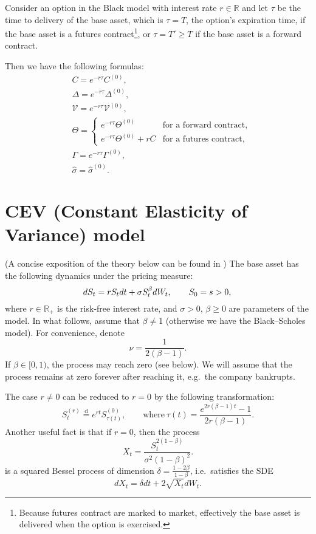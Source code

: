 \documentclass[a4paper,11pt,titlepage]{article}
\newcommand{\R}{\mathbb{R}}
\newcommand{\Vega}{\mathcal{V}}
\newcommand{\eqd}{\stackrel{\mathrm{d}}{=}}
\renewcommand{\hat}{\widehat}
\theoremstyle{remark}
\begin{document}
Consider an option in the Black model with interest rate $r\in \R$ and let $\tau$ be the time to delivery of the base asset, which is $\tau=T$, the option's expiration time, if the base asset is a futures contract\footnote{Because futures contract are marked to market, effectively the base asset is delivered when the option is exercised.}, or $\tau=T'\ge T$ if the base asset is a forward contract.

Then we have the following formulas:
\begin{align*}
&C      =  e^{-r\tau} C^{(0)},\\
&\Delta = e^{-r\tau}\Delta^{(0)},\\
&\Vega  = e^{-r\tau} \Vega^{(0)},\\
&\Theta =
  \begin{cases}
    e^{-r\tau} \Theta^{(0)}      &\text{for a forward contract},\\
    e^{-r\tau} \Theta^{(0)} + rC &\text{for a futures contract},
  \end{cases}\\
&\Gamma     = e^{-r\tau}\Gamma^{(0)},\\
&\hat\sigma = \hat\sigma^{(0)}.
\end{align*}


\section{CEV (Constant Elasticity of Variance) model}
(A concise exposition of the theory below can be found in \cite{LinetskyMendoza10})
The base asset has the following dynamics under the pricing measure:
\[
dS_t = rS_t dt + \sigma S_t^\beta dW_t, \qquad S_0 = s > 0,\\
\]
where $r\in\R_+$ is the risk-free interest rate, and $\sigma>0$, $\beta\ge 0$ are parameters of the model. In what follows, assume that $\beta\neq 1$ (otherwise we have the Black--Scholes model).
For convenience, denote
\[
\nu = \frac{1}{2(\beta-1)}.
\]
If $\beta\in[0,1)$, the process may reach zero (see below).
We will assume that the process remains at zero forever after reaching it, e.g.\ the company bankrupts.

The case $r\neq 0$ can be reduced to $r=0$ by the following transformation:
\begin{equation}
\label{cev-drift-change}
S_t^{(r)} \eqd e^{rt} S_{\tau(t)}^{(0)}, \qquad
  \text{where}\ \tau(t) = \frac{e^{2r(\beta-1)t} -1}{2r(\beta-1)}.
\end{equation}
Another useful fact is that if $r=0$, then the process
\begin{equation}
\label{cev-bessel}
X_t = \frac{S_t^{2(1-\beta)}}{\sigma^2(1-\beta)^2}.
\end{equation}
is a squared Bessel process of dimension $\delta=\frac{1-2\beta}{1-\beta}$, i.e.\ satisfies the SDE
\[
dX_t = \delta dt + 2\sqrt{X_t} dW_t.
\]
\end{document}
